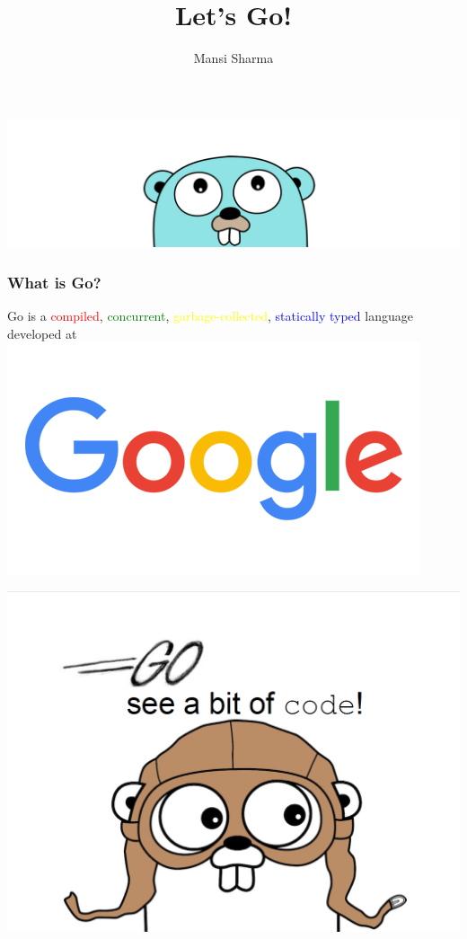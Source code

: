 \documentclass[14pt]{beamer}
\title[A Tour of Go]{\huge Let's Go!}
\author{Mansi Sharma}
\begin{document}
{
\begin{frame}
    \titlepage
    \includegraphics[width=\linewidth]{img/golang.png}
\end{frame}
}

{
\begin{frame}
    \frametitle {What is Go?}
    \begin{center}
    \textcolor{deepblue}{Go is a \textcolor{red}{compiled}, \textcolor{green}{concurrent}, \textcolor{yellow}{garbage-collected}, \textcolor{blue}{statically typed} language developed at}
    \linebreak
    \includegraphics[width=0.3\linewidth]{img/google.png}
    \end{center}
\end{frame}
}

{
\begin{frame}
    \includegraphics[width=\linewidth]{img/golang.PNG}
\end{frame}
}
\end{document}
